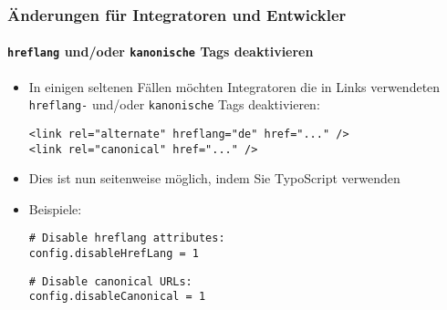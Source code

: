 %

\begin{frame}[fragile]
	\frametitle{Änderungen für Integratoren und Entwickler}
	\framesubtitle{\texttt{hreflang} und/oder \texttt{kanonische} Tags deaktivieren}


	\begin{itemize}
		\item In einigen seltenen Fällen möchten Integratoren die in Links verwendeten
			\texttt{hreflang-} und/oder \texttt{kanonische} Tags deaktivieren:
\begin{lstlisting}
<link rel="alternate" hreflang="de" href="..." />
<link rel="canonical" href="..." />
\end{lstlisting}
		\item Dies ist nun seitenweise möglich, indem Sie TypoScript verwenden
		\item Beispiele:
\begin{lstlisting}
# Disable hreflang attributes:
config.disableHrefLang = 1
\end{lstlisting}
\vspace{-0.2cm}
\begin{lstlisting}
# Disable canonical URLs:
config.disableCanonical = 1
\end{lstlisting}
	\end{itemize}

\end{frame}

